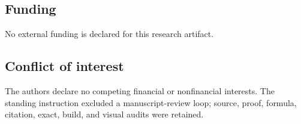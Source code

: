 \subsection{Funding}

No external funding is declared for this research artifact.

\subsection{Conflict of interest}

The authors declare no competing financial or nonfinancial interests. The
standing instruction excluded a manuscript-review loop; source, proof,
formula, citation, exact, build, and visual audits were retained.
